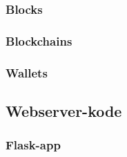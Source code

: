 \documentclass[a4paper, 8pt, oneside]{article} %
\begin{document}
\subsubsection{Blocks}

\newpage
\subsubsection{Blockchains}

\subsubsection{Wallets}

\newpage
\subsection{Webserver-kode}
\subsubsection{Flask-app}


\newpage
\printbibliography
\end{document}
